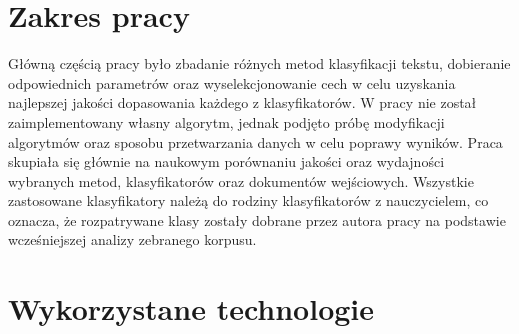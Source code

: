 \section{Zakres pracy}
Główną częścią pracy było zbadanie różnych metod klasyfikacji tekstu, dobieranie odpowiednich parametrów oraz wyselekcjonowanie cech w celu uzyskania najlepszej jakości dopasowania każdego z klasyfikatorów. W pracy nie został zaimplementowany własny algorytm, jednak podjęto próbę modyfikacji algorytmów oraz sposobu przetwarzania danych w celu poprawy wyników. Praca skupiała się głównie na naukowym porównaniu jakości oraz wydajności wybranych metod, klasyfikatorów oraz dokumentów wejściowych. Wszystkie zastosowane klasyfikatory należą do rodziny klasyfikatorów z nauczycielem, co oznacza, że rozpatrywane klasy zostały dobrane przez autora pracy na podstawie wcześniejszej analizy zebranego korpusu.

\section{Wykorzystane technologie}

